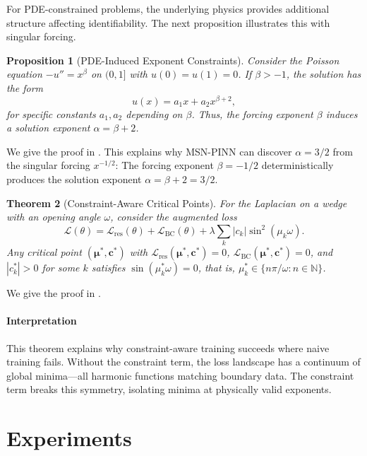 \documentclass{article}
\theoremstyle{plain}
\newtheorem{theorem}{Theorem}[section]
\newtheorem{proposition}[theorem]{Proposition}
\theoremstyle{definition}
\theoremstyle{remark}
\newcommand{\N}{\mathbb{N}}
\newcommand{\mcL}{\mathcal{L}}
\newcommand{\bmu}{\bm{\mu}}
\newcommand{\bc}{\bm{c}}
\begin{document}
For PDE-constrained problems, the underlying physics provides additional structure affecting identifiability. The next proposition illustrates this with singular forcing.
\begin{proposition}[PDE-Induced Exponent Constraints]
	\label{prop:pde_constraint}
	Consider the Poisson equation $-u'' = x^\beta$ on $(0,1]$ with $u(0) = u(1) = 0$. If $\beta > -1$, the solution has the form
	\begin{equation}
		u(x) = a_1 x + a_2 x^{\beta+2},
	\end{equation}
	for specific constants $a_1, a_2$ depending on $\beta$. Thus, the forcing exponent $\beta$ induces a solution exponent $\alpha = \beta + 2$.
\end{proposition}
We give the proof in . This explains why MSN-PINN can discover $\alpha = 3/2$ from the singular forcing $x^{-1/2}$: The forcing exponent $\beta = -1/2$ deterministically produces the solution exponent $\alpha = \beta + 2 = 3/2$.
\begin{theorem}[Constraint-Aware Critical Points]
	\label{thm:constraint}
	For the Laplacian on a wedge with an opening angle $\omega$, consider the augmented loss
	\begin{equation}
		\mcL(\theta) = \mcL_{\text{res}}(\theta) + \mcL_{\text{BC}}(\theta) + \lambda \sum_k |c_k| \sin^2(\mu_k \omega).
	\end{equation}
	Any critical point $(\bmu^*, \bc^*)$ with $\mcL_{\text{res}}(\bmu^*, \bc^*) = 0$, $\mcL_{\text{BC}}(\bmu^*, \bc^*) = 0$, and $|c_k^*| > 0$ for some $k$ satisfies $\sin(\mu_k^* \omega) = 0$, that is, $\mu_k^* \in \{n\pi/\omega : n \in \N\}$.
\end{theorem}
We give the proof in .

\paragraph{Interpretation} This theorem explains why constraint-aware training succeeds where naive training fails. Without the constraint term, the loss landscape has a continuum of global minima---all harmonic functions matching boundary data. The constraint term breaks this symmetry, isolating minima at physically valid exponents.

\section{Experiments}
\label{sec:experiments}
\end{document}
